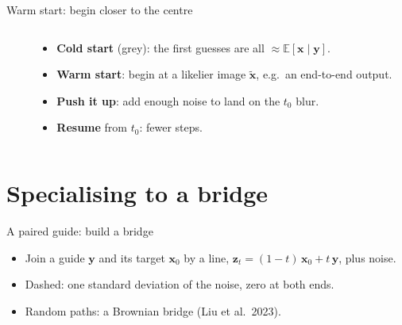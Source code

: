 \documentclass[aspectratio=169, 11pt]{beamer}
\newcommand{\x}{\bm{x}}
\newcommand{\y}{\bm{y}}
\newcommand{\z}{\bm{z}}
\newcommand{\tx}{\tilde{\bm{x}}}
\newcommand{\E}{\mathbb{E}}
\newcommand{\bridgeends}{%
  \draw[thick] plot[smooth] coordinates {(-0.8,2.4) (-0.15,1.2) (0,0.25) (-0.12,-0.9)
      (-0.6,-2.3)};
  \draw[thick] plot[smooth] coordinates {(10.05,2.4) (10,1.0) (10,-0.25) (10.08,-1.2)
      (10.5,-2.3)};
  \node[anchor=north, align=center] at (-0.6,-2.3) {side information};
  \node[anchor=north, align=center] at (10.5,-2.3) {target};}
\newcommand{\bridgeenvelope}[1]{%
  \draw[#1] plot[domain=0:10, samples=81, variable=\q]
      (\q, {0.25-0.05*\q + 2.8*sqrt(max(0,(\q/10)*(1-\q/10)))});
  \draw[#1] plot[domain=0:10, samples=81, variable=\q]
      (\q, {0.25-0.05*\q - 2.8*sqrt(max(0,(\q/10)*(1-\q/10)))});}
\begin{document}
\begin{frame}{Warm start: begin closer to the centre}
\begin{columns}[T]
\begin{column}{0.6\textwidth}
\end{column}
\begin{column}{0.38\textwidth}
\footnotesize
\begin{itemize}
  \setlength{\itemsep}{4pt}
  \item<1-| alert@1> \textbf{Cold start} (grey): the first guesses are all
        $\approx\E[\x\mid\y]$.
  \item<2-| alert@2> \textbf{Warm start}: begin at a likelier image $\tx$, e.g.\ an
        end-to-end output.
  \item<3-| alert@3> \textcolor{ca}{\textbf{Push it up}}: add enough noise to land on the $t_0$
        blur.
  \item<4-| alert@4> \textbf{Resume} from $t_0$: fewer steps.
\end{itemize}
\end{column}
\end{columns}
\end{frame}

\section{Specialising to a bridge}

\begin{frame}{A paired guide: build a bridge}
\centering
{}

\raggedright
\small
\begin{itemize}
  \setlength{\itemsep}{2pt}
  \item<1-> Join a guide $\y$ and its target $\x_0$ by a line, $\z_t = (1-t)\,\x_0 + t\,\y$,
        plus noise.
  \item<2-> \textcolor{cmean}{Dashed}: one standard deviation of the noise, zero at both ends.
  \item<3-> \textcolor{ca}{Random paths}: a Brownian bridge (Liu et al.\ 2023).
\end{itemize}
\end{frame}
\end{document}
